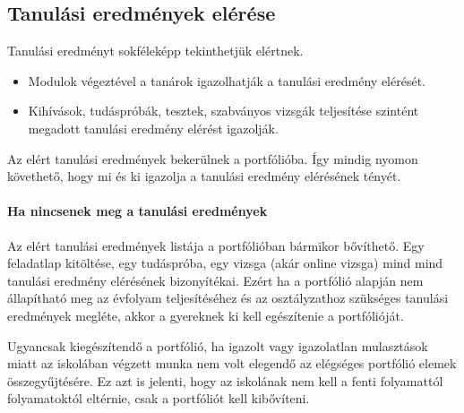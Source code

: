 \hypertarget{tanulasi-eredmenyek-elerese}{%
\subsection{Tanulási eredmények
elérése}\label{tanulasi-eredmenyek-elerese}}

Tanulási eredményt sokféleképp tekinthetjük elértnek.

\begin{itemize}
\tightlist
\item
  Modulok végeztével a tanárok igazolhatják a tanulási eredmény
  elérését.
\item
  Kihívások, tudáspróbák, tesztek, szabványos vizsgák teljesítése
  szintént megadott tanulási eredmény elérést igazolják.
\end{itemize}

Az elért tanulási eredmények bekerülnek a portfólióba. Így mindig nyomon
követhető, hogy mi és ki igazolja a tanulási eredmény elérésének tényét.

\hypertarget{ha-nincsenek-meg-a-tanulasi-eredmenyek}{%
\paragraph{Ha nincsenek meg a tanulási
eredmények}\label{ha-nincsenek-meg-a-tanulasi-eredmenyek}}

Az elért tanulási eredmények listája a portfólióban bármikor bővíthető.
Egy feladatlap kitöltése, egy tudáspróba, egy vizsga (akár online
vizsga) mind mind tanulási eredmény elérésének bizonyítékai. Ezért ha a
portfólió alapján nem állapítható meg az évfolyam teljesítéséhez és az
osztályzathoz szükséges tanulási eredmények megléte, akkor a gyereknek
ki kell egészítenie a portfólióját.

Ugyancsak kiegészítendő a portfólió, ha igazolt vagy igazolatlan
mulasztások miatt az iskolában végzett munka nem volt elegendő az
elégséges portfólió elemek összegyűjtésére. Ez azt is jelenti, hogy az
iskolának nem kell a fenti folyamattól folyamatoktól eltérnie, csak a
portfóliót kell kibővíteni.

